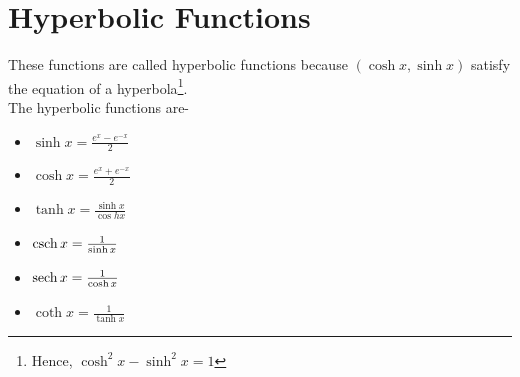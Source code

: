 \section{Hyperbolic Functions}
These functions are called hyperbolic functions because $(\cosh x,\sinh x)$ satisfy the equation of a hyperbola\footnote{Hence, $\cosh^2x-\sinh^2x=1$}.\\
The hyperbolic functions are-\begin{itemize}
	\item $\sinh x=\frac{e^x-e^{-x}}{2}$
	\item $\cosh x=\frac{e^x+e^{-x}}{2}$
	\item $\tanh x=\frac{\sinh x}{\cos hx}$
	\item $\csch x=\frac{1}{\sinh x}$
	\item $\sech x=\frac{1}{\cosh x}$
	\item $\coth x=\frac{1}{\tanh x}$
\end{itemize}

